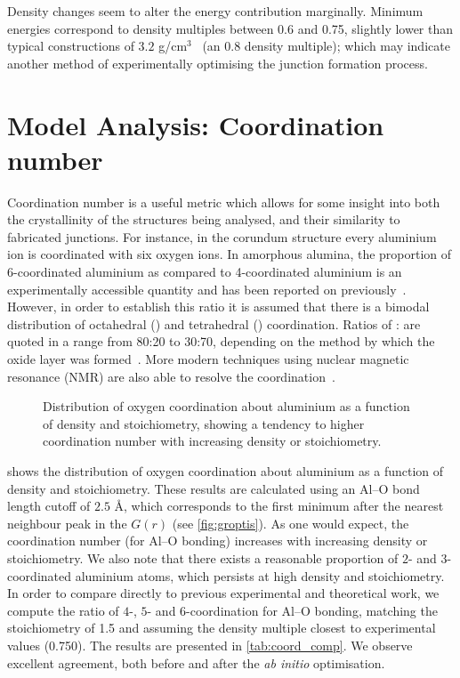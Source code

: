 Density changes seem to alter the energy contribution marginally.
Minimum energies correspond to density multiples between 0.6 and 0.75, slightly lower than typical constructions of $3.2$ g/cm$^\text{3}$~\cite{Barbour1998} (an 0.8 density multiple); which may indicate another method of experimentally optimising the junction formation process.

\section{Model Analysis{\rmfamily :} Coordination number}
Coordination number is a useful metric which allows for some insight into both the crystallinity of the structures being analysed, and their similarity to fabricated junctions. For instance, in the corundum structure every aluminium ion is coordinated with six oxygen ions. In amorphous alumina, the proportion of 6-coordinated aluminium as compared to 4-coordinated aluminium is an experimentally accessible quantity and has been reported on previously~\cite{ElMashri1983}. However, in order to establish this ratio it is assumed that there is a bimodal distribution of octahedral () and tetrahedral () coordination. Ratios of : are quoted in a range from 80:20 to 30:70, depending on the method by which the oxide layer was formed~\cite{Bourdillon1984}. More modern techniques using nuclear magnetic resonance (NMR) are also able to resolve the  coordination~\cite{Lee2009}.


\begin{figure}[tbh]
\centering
\caption{\label{fig:coordinationnumber}Distribution of oxygen coordination about aluminium as a function of density and stoichiometry, showing a tendency to higher coordination number with increasing density or stoichiometry.}%
\end{figure}

 shows the distribution of oxygen coordination about aluminium as a function of density and stoichiometry. These results are calculated using an Al--O bond length cutoff of $2.5$ \AA, which corresponds to the first minimum after the nearest neighbour peak in the $G(r)$ (see \cref{fig:groptis}). As one would expect, the coordination number (for Al--O bonding) increases with increasing density or stoichiometry. We also note that there exists a reasonable proportion of $2$- and $3$-coordinated aluminium atoms, which persists at high density and stoichiometry. In order to compare directly to previous experimental and theoretical work, we compute the ratio of $4$-, $5$- and $6$-coordination for Al--O bonding, matching the stoichiometry of 1.5 and assuming the density multiple closest to experimental values (0.750). The results are presented in \cref{tab:coord_comp}. We observe excellent agreement, both before and after the \textit{ab initio} optimisation.

